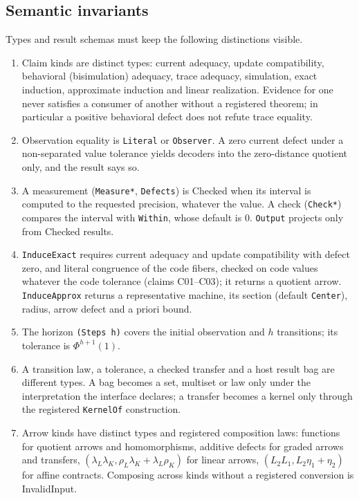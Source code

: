 \documentclass[11pt]{article}
\newcommand{\code}[1]{\texttt{#1}}
\begin{document}
\subsection{Semantic invariants}\label{sec:invariants}

Types and result schemas must keep the following distinctions visible.
\begin{enumerate}
\item Claim kinds are distinct types: current adequacy, update compatibility, behavioral
(bisimulation) adequacy, trace adequacy, simulation, exact induction, approximate induction and
linear realization. Evidence for one never satisfies a consumer of another without a registered
theorem; in particular a positive behavioral defect does not refute trace equality.
\item Observation equality is \code{Literal} or \code{Observer}. A zero current defect under a
non-separated value tolerance yields decoders into the zero-distance quotient only, and the result
says so.
\item A measurement (\code{Measure*}, \code{Defects}) is Checked when its interval is computed to the
requested precision, whatever the value. A check (\code{Check*}) compares the interval with
\code{Within}, whose default is $0$. \code{Output} projects only from Checked results.
\item \code{InduceExact} requires current adequacy and update compatibility with defect zero, and
literal congruence of the code fibers, checked on code values whatever the code tolerance (claims
C01--C03); it returns a quotient arrow. \code{InduceApprox} returns a representative machine, its
section (default \code{Center}), radius, arrow defect and a priori bound.
\item The horizon \code{(Steps h)} covers the initial observation and $h$ transitions; its tolerance is
$\Phi^{h+1}(1)$.
\item A transition law, a tolerance, a checked transfer and a host result bag are different types. A
bag becomes a set, multiset or law only under the interpretation the interface declares; a transfer
becomes a kernel only through the registered \code{KernelOf} construction.
\item Arrow kinds have distinct types and registered composition laws: functions for quotient arrows
and homomorphisms, additive defects for graded arrows and transfers, $(\lambda_L\lambda_K,
\rho_L\lambda_K+\lambda_L\rho_K)$ for linear arrows, $(L_2L_1,L_2\eta_1+\eta_2)$ for affine contracts.
Composing across kinds without a registered conversion is InvalidInput.

\end{enumerate}
\end{document}
